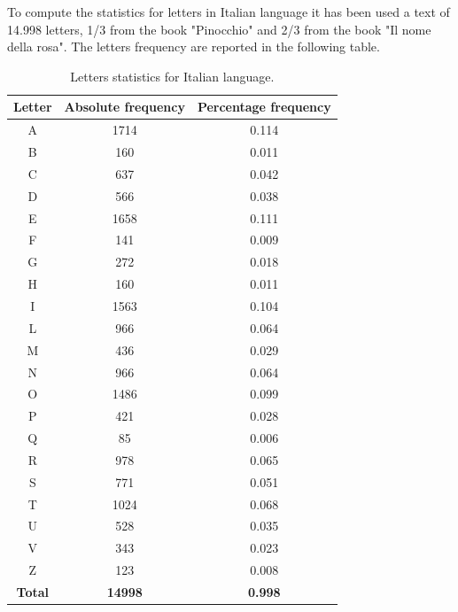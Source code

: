\documentclass[a4paper, 12pt]{report}
\begin{document}
To compute the statistics for letters in Italian language it has been used a text of 14.998 letters, 1/3 from the book "Pinocchio" and 2/3 from the book "Il nome della rosa". The letters frequency are reported in the following table.
\newpage
\begin{table}[h!]
	\centering
	\begin{tabular}{||c | c | c||} 
		\hline
		\textbf{Letter} & \textbf{Absolute frequency} & \textbf{Percentage frequency} \\ 
		\hline\hline
		A & 1714 & 0.114 \\ 
		\hline
		B & 160 & 0.011 \\ 
		\hline
		C & 637 & 0.042 \\ 
		\hline
		D & 566 & 0.038 \\ 
		\hline
		E & 1658 & 0.111 \\ 
		\hline
		F & 141 & 0.009 \\ 
		\hline
		G & 272 & 0.018 \\ 
		\hline
		H & 160 & 0.011 \\ 
		\hline
		I & 1563 & 0.104 \\ 
		\hline
		L & 966 & 0.064 \\ 
		\hline
		M & 436 & 0.029 \\ 
		\hline
		N & 966 & 0.064 \\ 
		\hline
		O & 1486 & 0.099 \\ 
		\hline
		P & 421 & 0.028 \\ 
		\hline
		Q & 85 & 0.006 \\ 
		\hline
		R & 978 & 0.065 \\ 
		\hline
		S & 771 & 0.051 \\ 
		\hline
		T & 1024 & 0.068 \\ 
		\hline
		U & 528 & 0.035 \\ 
		\hline
		V & 343 & 0.023 \\ 
		\hline
		Z & 123 & 0.008 \\ 
		\hline
		\textbf{Total} & \textbf{14998} & \textbf{0.998} \\ 
		\hline
	\end{tabular}
	\label{tab:italianstats}
	\caption{Letters statistics for Italian language.}
\end{table}
\end{document}
